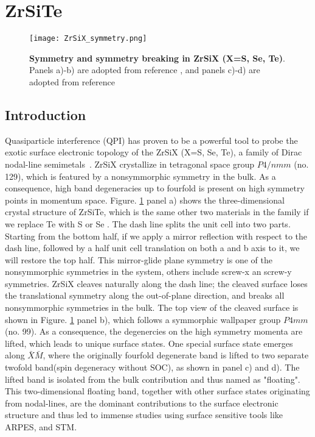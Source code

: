 \section{ZrSiTe}
\begin{figure}
	\texttt{[image: ZrSiX\_symmetry.png]} 
	\centering
	\caption[\textbf{Symmetry and symmetry breaking in ZrSiX (X=S, Se, Te)}]{\textbf{Symmetry and symmetry breaking in ZrSiX (X=S, Se, Te)}. Panels a)-b) are adopted from reference \cite{stuartScanningTunnellingMicroscopy2021}, and panels c)-d) are adopted from reference \cite{toppSurfaceFloating2D2017}}
	\label{fig:ZrSiX_symm}
\end{figure}
\subsection{Introduction}
Quasiparticle interference (QPI) has proven to be a powerful tool to probe the exotic surface electronic topology of the ZrSiX (X=S, Se, Te), a family of Dirac nodal-line semimetals~\cite{muechlerModularArithmeticNodal2020}. ZrSiX crystallize in tetragonal space group $P4/nmm$ (no. 129), which is featured by a nonsymmorphic symmetry in the bulk. As a consequence, high band degeneracies up to fourfold is present on high symmetry points in momentum space. Figure. \ref{fig:ZrSiX_symm} panel a) shows the three-dimensional crystal structure of ZrSiTe, which is the same other two materials in the family if we replace Te with S or Se \cite{stuartQuasiparticleInterferenceObservation2022}. The dash line splits the unit cell into two parts. Starting from the bottom half, if we apply a mirror reflection with respect to the dash line, followed by a half unit cell translation on both a and b axis to it, we will restore the top half. This mirror-glide plane symmetry is one of the nonsymmorphic symmetries in the system, others include screw-x an screw-y symmetries. ZrSiX cleaves naturally along the dash line; the cleaved surface loses the translational symmetry along the out-of-plane direction, and breaks all nonsymmorphic symmetries in the bulk. The top view of the cleaved surface is shown in Figure. \ref{fig:ZrSiX_symm} panel b), which follows a symmorphic wallpaper group $P4mm$ (no. 99). As a consequence, the degenercies on the high symmetry momenta are lifted, which leads to unique surface states. One special surface state emerges along  $\bar{X}\bar{M}$, where the originally fourfold degenerate band is lifted to two separate twofold band(spin degeneracy without SOC), as shown in panel c) and d)\cite{toppSurfaceFloating2D2017}. The lifted band is isolated from the bulk contribution and thus named as "floating". This two-dimensional floating band, together with other surface states originating from nodal-lines, are the dominant contributions to the surface electronic structure and thus led to immense studies using surface sensitive tools like \ac{ARPES}\cite{toppSurfaceFloating2D2017,toppNonsymmorphicBandDegeneracy2016}, and \ac{STM}\cite{lodgeObservationEffectivePseudospin2017,zhuQuasiparticleInterferenceNonsymmorphic2018,butlerQuasiparticleInterferenceZrSiS2017,buVisualizationElectronicTopology2018,stuartQuasiparticleInterferenceObservation2022}. 

